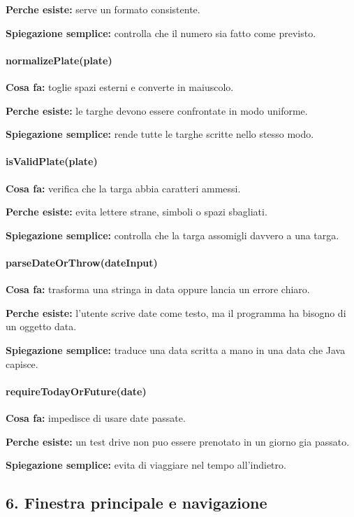 \documentclass[12pt,a4paper]{article}
\begin{document}
\textbf{Perche esiste:} serve un formato consistente.

\textbf{Spiegazione semplice:} controlla che il numero sia fatto come previsto.

\paragraph{normalizePlate(plate)}
\textbf{Cosa fa:} toglie spazi esterni e converte in maiuscolo.

\textbf{Perche esiste:} le targhe devono essere confrontate in modo uniforme.

\textbf{Spiegazione semplice:} rende tutte le targhe scritte nello stesso modo.

\paragraph{isValidPlate(plate)}
\textbf{Cosa fa:} verifica che la targa abbia caratteri ammessi.

\textbf{Perche esiste:} evita lettere strane, simboli o spazi sbagliati.

\textbf{Spiegazione semplice:} controlla che la targa assomigli davvero a una targa.

\paragraph{parseDateOrThrow(dateInput)}
\textbf{Cosa fa:} trasforma una stringa in data oppure lancia un errore chiaro.

\textbf{Perche esiste:} l'utente scrive date come testo, ma il programma ha bisogno di un oggetto data.

\textbf{Spiegazione semplice:} traduce una data scritta a mano in una data che Java capisce.

\paragraph{requireTodayOrFuture(date)}
\textbf{Cosa fa:} impedisce di usare date passate.

\textbf{Perche esiste:} un test drive non puo essere prenotato in un giorno gia passato.

\textbf{Spiegazione semplice:} evita di viaggiare nel tempo all'indietro.

\subsection{6. Finestra principale e navigazione}
\end{document}
